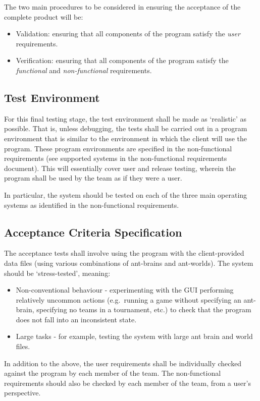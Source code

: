 \documentclass[11pt]{article}
\begin{document}
The two main procedures to be considered in ensuring the acceptance of
the complete product will be:
\begin{itemize}
\item Validation: ensuring that all components
of the program satisfy the \emph{user} requirements.
\item Verification:
ensuring that all components of the program satisfy the
\emph{functional} and \emph{non-functional} requirements.
\end{itemize}

\subsection{Test Environment}\label{test-environment}

For this final testing stage, the test environment shall be made as
`realistic' as possible. That is, unless debugging, the tests shall be
carried out in a program environment that is similar to the environment
in which the client will use the program. These program environments are
specified in the non-functional requirements (see supported systems in
the non-functional requirements document). This will essentially cover
user and release testing, wherein the program shall be used by the team
as if they were a user.

In particular, the system should be tested on each of the three main
operating systems as identified in the non-functional requirements.

\subsection{Acceptance Criteria Specification}\label{acceptance-tests}

The acceptance tests shall involve using the program with the
client-provided data files (using various combinations of ant-brains and
ant-worlds). The system should be `stress-tested', meaning: 
\begin{itemize}
\item Non-conventional behaviour - experimenting with the GUI performing
relatively uncommon actions (e.g.~running a game without specifying an
ant-brain, specifying no teams in a tournament, etc.) to check that the
program does not fall into an inconsistent state.
\item Large tasks - for
example, testing the system with large ant brain and world files.
\end{itemize}
In addition to the above, the user requirements shall be individually
checked against the program by each member of the team. The
non-functional requirements should also be checked by each member of the
team, from a user's perspective.
\end{document}
